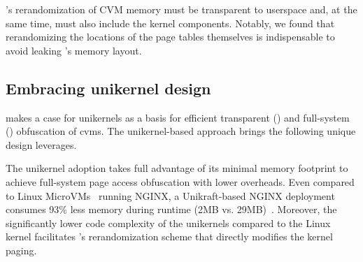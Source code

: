 \thename's rerandomization of CVM memory must be transparent to userspace and, at the same time, must also include the kernel components.
Notably, we found that rerandomizing the locations of the page tables themselves is indispensable to avoid leaking \thename's memory layout.



\subsection{Embracing unikernel design }
\label{sec:overview:unikernel}

\thename makes a case for unikernels as a basis for efficient transparent (\reqtransparent) and full-system (\reqfullsystem) obfuscation of \glspl{cvm}.
The unikernel-based approach brings the following unique design leverages.

The unikernel adoption takes full advantage of its minimal memory footprint to achieve full-system page access obfuscation with lower overheads.
Even compared to Linux MicroVMs~\cite{microvm} running NGINX, a Unikraft-based NGINX deployment consumes 93\% less memory during runtime (2MB vs. 29MB)~\cite{unikraft-performance}.
Moreover, the significantly lower code complexity of the unikernels compared to the Linux kernel facilitates \thename's rerandomization scheme that directly modifies the kernel paging.

